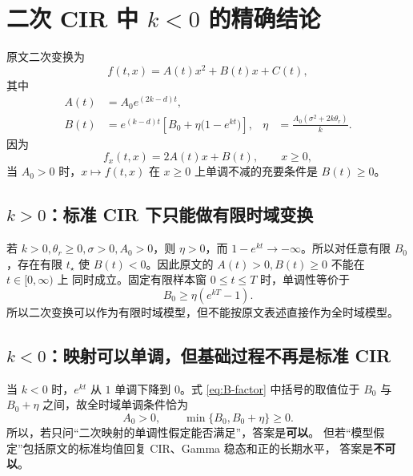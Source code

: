 \documentclass[UTF8,11pt]{ctexart}
\begin{document}
\section{二次 CIR 中 $k<0$ 的精确结论}

原文二次变换为
\[
 f(t,x)=A(t)x^2+B(t)x+C(t),
\]
其中
\begin{align}
 A(t)&=A_0e^{(2k-d)t},\\
 B(t)&=e^{(k-d)t}\left[B_0+
 \eta\bigl(1-e^{kt}\bigr)\right],
 &\eta&=\frac{A_0(\sigma^2+2k\theta_r)}{k}.
 \label{eq:B-factor}
\end{align}
因为
\[
 f_x(t,x)=2A(t)x+B(t),\qquad x\geq0,
\]
当 $A_0>0$ 时，$x\mapsto f(t,x)$ 在 $x\geq0$ 上单调不减的充要条件是
$B(t)\geq0$。

\subsection{$k>0$：标准 CIR 下只能做有限时域变换}

若 $k>0,\theta_r\geq0,\sigma>0,A_0>0$，则 $\eta>0$，而
$1-e^{kt}\to-\infty$。所以对任意有限 $B_0$，存在有限 $t_\star$ 使
$B(t)<0$。因此原文的 $A(t)>0,B(t)\geq0$ 不能在 $t\in[0,\infty)$ 上
同时成立。固定有限样本窗 $0\leq t\leq T$ 时，单调性等价于
\begin{equation}
 B_0\geq \eta(e^{kT}-1).
 \label{eq:finite-window-monotonicity}
\end{equation}
所以二次变换可以作为有限时域模型，但不能按原文表述直接作为全时域模型。

\subsection{$k<0$：映射可以单调，但基础过程不再是标准 CIR}

当 $k<0$ 时，$e^{kt}$ 从 $1$ 单调下降到 $0$。式 \eqref{eq:B-factor}
中括号的取值位于 $B_0$ 与 $B_0+\eta$ 之间，故全时域单调条件恰为
\begin{equation}
 A_0>0,\qquad \min\{B_0,B_0+\eta\}\geq0.
 \label{eq:knegative-monotonicity}
\end{equation}
所以，若只问“二次映射的单调性假定能否满足”，答案是\textbf{可以}。
但若“模型假定”包括原文的标准均值回复 CIR、Gamma 稳态和正的长期水平，
答案是\textbf{不可以}。
\end{document}

